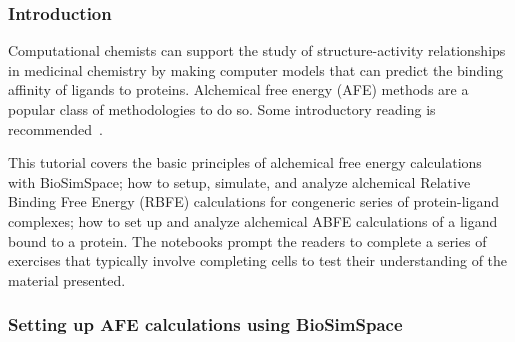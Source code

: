 
\subsubsection{Introduction}


Computational chemists can support the study of structure-activity relationships in medicinal chemistry by making computer models that can predict the binding affinity of ligands to proteins. Alchemical free energy (AFE) methods are a popular class of methodologies to do so. Some
introductory reading is recommended~\cite{mey2020best, cournia_allen_sherman_2017, kuhn_firth-clark_tosco_mey_mackey_michel_2020, Hahn2022}.

This tutorial covers the basic principles of alchemical free energy calculations with BioSimSpace; how to setup, simulate, and analyze alchemical Relative Binding Free Energy (RBFE) calculations for congeneric series of protein-ligand complexes; how to set up and analyze alchemical ABFE calculations of a ligand bound to a protein.  
The notebooks prompt the readers to complete a series of exercises that typically involve completing cells to test their understanding of the material presented. 

\subsubsection{Setting up AFE calculations using BioSimSpace}

